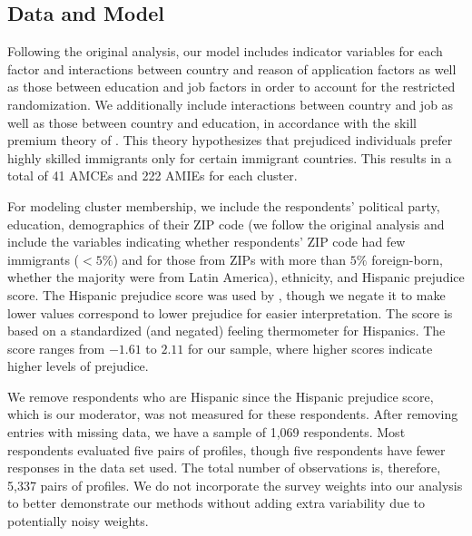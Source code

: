 \subsection{Data and Model}\label{sec:analysis:data_model}

Following the original analysis, our model includes indicator variables
for each factor and interactions between country and reason of
application factors as well as those between education and job factors
in order to account for the restricted randomization.  We additionally
include interactions between country and job as well as those between
country and education, in accordance with the skill premium theory of
\cite{newman2019economic}.  This theory hypothesizes that prejudiced
individuals prefer highly skilled immigrants only for certain
immigrant countries.  This results in a total of 41 AMCEs and 222
AMIEs for each cluster.

For modeling cluster membership, we include the respondents' political
party, education, demographics of their ZIP code (we follow the
original analysis and include the variables indicating whether
respondents' ZIP code had few immigrants ($<5\%$) and for those from
ZIPs with more than $5\%$ foreign-born, whether the majority were from
Latin America), ethnicity, and Hispanic prejudice score.  The Hispanic
prejudice score was used by \cite{newman2019economic}, though we
negate it to make lower values correspond to lower prejudice for
easier interpretation.  The score is based on a standardized (and
negated) feeling thermometer for Hispanics.  The score ranges from
$-1.61$ to $2.11$ for our sample, where higher scores indicate higher
levels of prejudice.


We remove respondents who are Hispanic since the Hispanic prejudice
score, which is our moderator, was not measured for these respondents.
After removing entries with missing data, we have a sample of 1,069
respondents. Most respondents evaluated five pairs of profiles, though
five respondents have fewer responses in the data set used.  The total
number of observations is, therefore, 5,337 pairs of profiles.  We do
not incorporate the survey weights into our analysis to better
demonstrate our methods without adding extra variability due to
potentially noisy weights.

